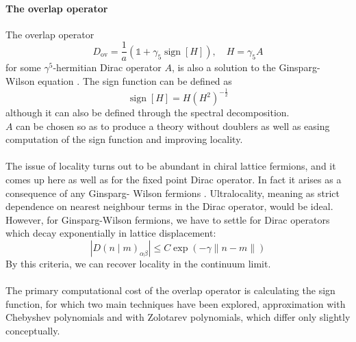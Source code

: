 \documentclass[a4paper,10pt]{article}
\begin{document}
\paragraph{The overlap operator}
The overlap operator
\begin{equation}
D_{\mathrm{ov}}=\frac{1}{a}\left(\mathbb{1}+\gamma_{5} \operatorname{sign}[H]\right), \quad H=\gamma_{5} A
\end{equation}
for some $\gamma^5$-hermitian Dirac operator $A$, is also a solution to the Ginsparg- Wilson equation \cite{PhysRevLett.81.4060}. The sign function can be defined as 
\begin{equation}
\operatorname{sign}[H] = H\left( H^2 \right)^{-\frac{1}{2}}
\end{equation}
although it can also be defined through the spectral decomposition.\\$A$ can be chosen so as to produce a theory without doublers as well as easing computation of the sign function and improving locality.\\\\The issue of locality turns out to be abundant in chiral lattice fermions, and it comes up here as well as for the fixed point Dirac operator. In fact it arises as a consequence of any Ginsparg- Wilson fermions \cite{horvath1998ginsparg}. Ultralocality, meaning as strict dependence on nearest neighbour terms in the Dirac operator, would be ideal. However, for Ginsparg-Wilson fermions, we have to settle for Dirac operators which decay exponentially in lattice displacement:
 \begin{equation}
\left|D(n \mid m)_{\alpha \beta}\right| \leq C \exp (-\gamma\|n-m\|)
\end{equation}
By this criteria, we can recover locality in the continuum limit.\\\\The primary computational cost of the overlap operator is calculating the sign function, for which two main techniques have been explored, approximation with Chebyshev polynomials and with Zolotarev polynomials, which differ only slightly conceptually.
\end{document}
